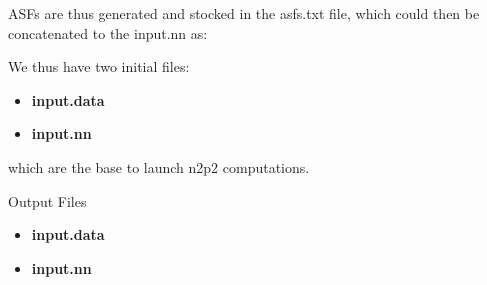 \documentclass[12pt]{article}
\begin{document}
ASFs are thus generated and stocked in the asfs.txt file, which could then be concatenated to the input.nn as:
\begin{center}
\end{center}
We thus have two initial files:
\begin{itemize}
    \item \textbf{input.data}
    \item \textbf{input.nn}
\end{itemize}
which are the base to launch n2p2 computations.
\\
\begin{mybox3}{Output Files}
\begin{itemize}
    \item \textbf{input.data}
    \item \textbf{input.nn} 
\end{itemize}
\end{mybox3}
%
\end{document}
